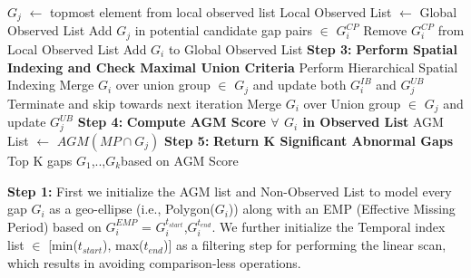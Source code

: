 \documentclass[acmsmall]{acmart}
\begin{document}
\begin{algorithm}
\begin{algorithmic}[1]
        \State $G_{j}$ $\leftarrow$ topmost element from local observed list
        \State Local Observed List $\leftarrow$ Global Observed List
                \State Add $G_{j}$ in potential candidate gap pairs $\in$ $G_{i}^{CP}$
            \EndIf
            \State Remove $G_{i}^{CP}$ from Local Observed List
        \EndWhile
        Add $G_{i}$ to Global Observed List
        \State \textbf{Step 3:} \textbf{Perform Spatial Indexing and Check Maximal Union Criteria}
        \State Perform Hierarchical Spatial Indexing
                \State Merge $G_{i}$ over union group $\in$ $G_{j}$ and update both $G_{i}^{IB}$ and $G_{j}^{UB}$
                \State Terminate and skip towards next iteration
            \EndIf
                \State Merge $G_{i}$ over Union group $\in$ $G_{j}$ and update $G_{j}^{UB}$
            \EndIf
        \EndFor
    \EndFor
    \State \textbf{Step 4:} \textbf{Compute AGM Score $\forall$ $G_{i}$ in Observed List}
                \State AGM List $\leftarrow$ $AGM(MP \cap G_{j})$ 
            \EndIf
        \EndFor
    \State \textbf{Step 5:} \textbf{Return K Significant Abnormal Gaps}
    \State \Return Top K gaps \lbrack$G_{1}$,..,$G_{k}$\rbrack based on AGM Score
\EndProcedure
\end{algorithmic}
\end{algorithm}

\textbf{Step 1:} First we initialize the AGM list and Non-Observed List to model every gap $G_{i}$ as a geo-ellipse (i.e., Polygon($G_{i}$)) along with an EMP (Effective Missing Period) based on $G_{i}^{EMP}$ = \lbrack ${G_{i}^{t_{start}}}$,${G_{i}^{t_{end}}}$\rbrack. We further initialize the Temporal index list $\in$ [min(${t_{start}}$), max(${t_{end}}$)] as a filtering step for performing the linear scan, which results in avoiding comparison-less operations.
\end{document}
